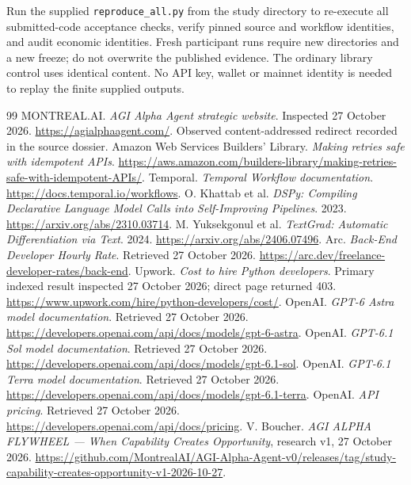 \documentclass[11pt,letterpaper]{article}
\begin{document}
Run the supplied \texttt{reproduce\_all.py} from the study directory to re-execute all submitted-code acceptance checks, verify pinned source and workflow identities, and audit economic identities. Fresh participant runs require new directories and a new freeze; do not overwrite the published evidence. The ordinary library control uses identical content. No API key, wallet or mainnet identity is needed to replay the finite supplied outputs.



\begin{thebibliography}{99}\small
{} MONTREAL.AI. \emph{AGI Alpha Agent strategic website}. Inspected 27 October 2026. \url{https://agialphaagent.com/}. Observed content-addressed redirect recorded in the source dossier.
 Amazon Web Services Builders' Library. \emph{Making retries safe with idempotent APIs}. \url{https://aws.amazon.com/builders-library/making-retries-safe-with-idempotent-APIs/}.
 Temporal. \emph{Temporal Workflow documentation}. \url{https://docs.temporal.io/workflows}.
 O. Khattab et al. \emph{DSPy: Compiling Declarative Language Model Calls into Self-Improving Pipelines}. 2023. \url{https://arxiv.org/abs/2310.03714}.
 M. Yuksekgonul et al. \emph{TextGrad: Automatic Differentiation via Text}. 2024. \url{https://arxiv.org/abs/2406.07496}.
 Arc. \emph{Back-End Developer Hourly Rate}. Retrieved 27 October 2026. \url{https://arc.dev/freelance-developer-rates/back-end}.
 Upwork. \emph{Cost to hire Python developers}. Primary indexed result inspected 27 October 2026; direct page returned 403. \url{https://www.upwork.com/hire/python-developers/cost/}.
 OpenAI. \emph{GPT-6 Astra model documentation}. Retrieved 27 October 2026. \url{https://developers.openai.com/api/docs/models/gpt-6-astra}.
 OpenAI. \emph{GPT-6.1 Sol model documentation}. Retrieved 27 October 2026. \url{https://developers.openai.com/api/docs/models/gpt-6.1-sol}.
 OpenAI. \emph{GPT-6.1 Terra model documentation}. Retrieved 27 October 2026. \url{https://developers.openai.com/api/docs/models/gpt-6.1-terra}.
 OpenAI. \emph{API pricing}. Retrieved 27 October 2026. \url{https://developers.openai.com/api/docs/pricing}.
 V. Boucher. \emph{AGI ALPHA FLYWHEEL --- When Capability Creates Opportunity}, research v1, 27 October 2026. \url{https://github.com/MontrealAI/AGI-Alpha-Agent-v0/releases/tag/study-capability-creates-opportunity-v1-2026-10-27}.

\end{thebibliography}
\end{document}
